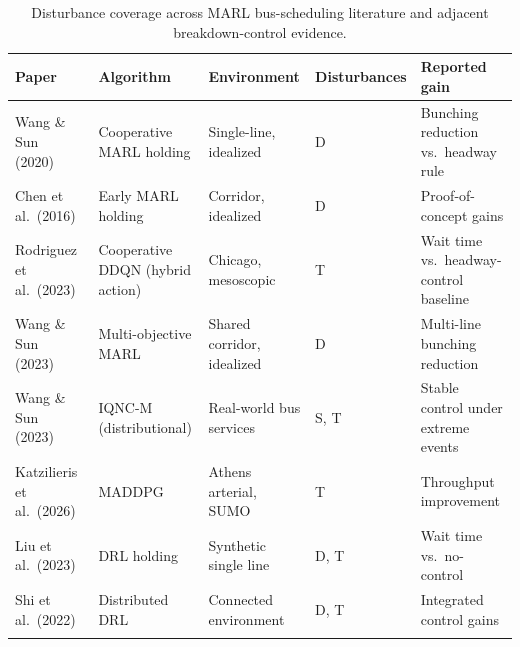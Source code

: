\begin{table}[htbp]
\centering
\caption{Disturbance coverage across MARL bus-scheduling literature and adjacent breakdown-control evidence.}
\label{tab:marl_performance}

\footnotesize
\renewcommand{\arraystretch}{1.3}

\begin{tabularx}{\textwidth}{
>{\RaggedRight\arraybackslash}p{2.5cm}
>{\RaggedRight\arraybackslash}p{3.0cm}
>{\RaggedRight\arraybackslash}p{2.8cm}
>{\Centering\arraybackslash}p{2.2cm}
>{\RaggedRight\arraybackslash}X
}

\toprule
\textbf{Paper} &
\textbf{Algorithm} &
\textbf{Environment} &
\textbf{Disturbances} &
\textbf{Reported gain} \\
\midrule

Wang \& Sun (2020)~\cite{Wang2020Holding} &
Cooperative MARL holding &
Single-line, idealized &
D &
Bunching reduction vs.\ headway rule \\

Chen et al.\ (2016)~\cite{Chen2016MARLBus} &
Early MARL holding &
Corridor, idealized &
D &
Proof-of-concept gains \\

Rodriguez et al.\ (2023)~\cite{Rodriguez2023Cooperative} &
Cooperative DDQN (hybrid action) &
Chicago, mesoscopic &
T &
Wait time vs.\ headway-control baseline \\

Wang \& Sun (2023)~\cite{Wang2023MultiObj} &
Multi-objective MARL &
Shared corridor, idealized &
D &
Multi-line bunching reduction \\

Wang \& Sun (2023)~\cite{Wangsun} &
IQNC-M (distributional) &
Real-world bus services &
S, T &
Stable control under extreme events \\

Katzilieris et al.\ (2026)~\cite{Katzilieris2026MARL} &
MADDPG &
Athens arterial, SUMO &
T &
Throughput improvement \\

Liu et al.\ (2023)~\cite{Liu2023DRLHolding} &
DRL holding &
Synthetic single line &
D, T &
Wait time vs.\ no-control \\

Shi et al.\ (2022)~\cite{Shi2022DistDRL} &
Distributed DRL &
Connected environment &
D, T &
Integrated control gains \\

\addlinespace[2pt]
\multicolumn{5}{l}{\textit{Adjacent breakdown-control evidence (not MARL bus control)}} \\
\midrule


\end{tabularx}
\end{table}
